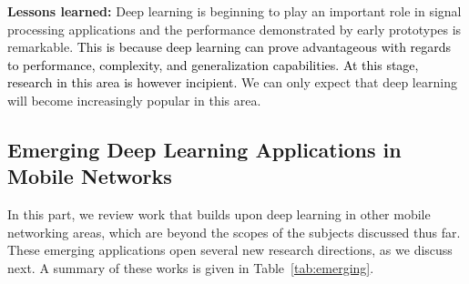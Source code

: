 \documentclass[journal,comsoc,letter]{IEEEtran}
\newcommand{\rev}[1]{\textcolor{black}{#1}}
\begin{document}
\textbf{Lessons learned:} Deep learning is beginning to play an important role in signal processing applications and the performance demonstrated by early prototypes is remarkable. \rev{This is because deep learning can prove advantageous with regards to performance, complexity, and generalization capabilities. At this stage, research in this area is however incipient.} We can only expect that deep learning will become increasingly popular in this area.

\subsection{Emerging Deep Learning Applications in Mobile \mbox{Networks}}
In this part, we review work that builds upon deep learning in other mobile networking areas, which are beyond the scopes of the subjects discussed thus far. These emerging applications open several new research directions, as we discuss next. A summary of these works is given in Table~\ref{tab:emerging}.\\
 
\end{document}

